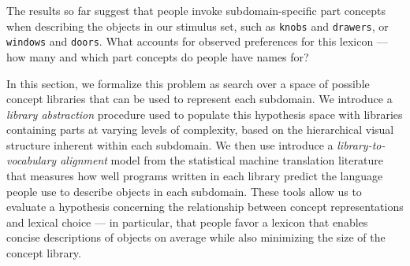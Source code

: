 The results so far suggest that people invoke subdomain-specific part concepts when describing the objects in our stimulus set, such as \texttt{knobs} and \texttt{drawers}, or \texttt{windows} and \texttt{doors}.
What accounts for observed preferences for this lexicon --- how many and which part concepts do people have names for?

In this section, we formalize this problem as search over a space of possible concept libraries that can be used to represent each subdomain. We introduce a \textit{library abstraction} procedure used to populate this hypothesis space with libraries containing parts at varying levels of complexity, based on the hierarchical visual structure inherent within each subdomain. We then use introduce a \textit{library-to-vocabulary alignment} model from the statistical machine translation literature that measures how well programs written in each library predict the language people use to describe objects in each subdomain.
These tools allow us to evaluate a hypothesis concerning the relationship between concept representations and lexical choice --- in particular, that people favor a lexicon that enables concise descriptions of objects on average while also minimizing the size of the concept library.




